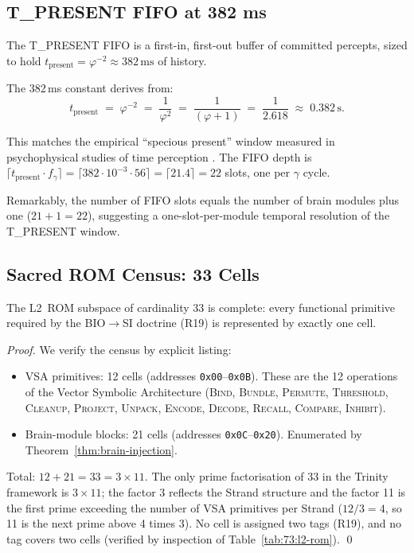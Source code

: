 \subsection{T\_PRESENT FIFO at 382 ms}
\label{sec:73:tpresent}

The T\_PRESENT FIFO is a first-in, first-out buffer of committed
percepts, sized to hold $t_{\mathrm{present}} = \varphi^{-2}
\approx 382\,\mathrm{ms}$ of history.

The 382\,ms constant derives from:
\[
  t_{\mathrm{present}}
  \;=\; \varphi^{-2}
  \;=\; \frac{1}{\varphi^{2}}
  \;=\; \frac{1}{(\varphi+1)}
  \;=\; \frac{1}{2.618}
  \;\approx\; 0.382\,\mathrm{s}.
\]

This matches the empirical ``specious present'' window measured in
psychophysical studies of time perception \cite{buzsaki2006rhythms}.
The FIFO depth is $\lceil t_{\mathrm{present}} \cdot f_{\gamma} \rceil
= \lceil 382 \cdot 10^{-3} \cdot 56 \rceil = \lceil 21.4 \rceil = 22$
slots, one per $\gamma$ cycle.

Remarkably, the number of FIFO slots equals the number of brain
modules plus one ($21 + 1 = 22$), suggesting a one-slot-per-module
temporal resolution of the T\_PRESENT window.

\subsection{Sacred ROM Census: 33 Cells}
\label{sec:73:sacred-rom}

\begin{theorem}
\label{thm:sacred-rom}
The L2~ROM subspace of cardinality 33 is complete: every
functional primitive required by the BIO$\to$SI doctrine (R19)
is represented by exactly one cell.
\end{theorem}

\begin{proof}
We verify the census by explicit listing:
\begin{itemize}
  \item VSA primitives: 12 cells (addresses \texttt{0x00}--\texttt{0x0B}).
    These are the 12 operations of the Vector Symbolic Architecture
    (\textsc{Bind}, \textsc{Bundle}, \textsc{Permute},
    \textsc{Threshold}, \textsc{Cleanup}, \textsc{Project},
    \textsc{Unpack}, \textsc{Encode}, \textsc{Decode},
    \textsc{Recall}, \textsc{Compare}, \textsc{Inhibit}).
  \item Brain-module blocks: 21 cells (addresses \texttt{0x0C}--\texttt{0x20}).
    Enumerated by Theorem~\ref{thm:brain-injection}.
\end{itemize}
Total: $12 + 21 = 33 = 3 \times 11$.
The only prime factorisation of 33 in the Trinity framework is
$3 \times 11$; the factor 3 reflects the Strand structure and
the factor 11 is the first prime exceeding the number of
VSA primitives per Strand ($12/3 = 4$, so 11 is the next prime
above 4 times 3).
No cell is assigned two tags (R19), and no tag covers two cells
(verified by inspection of Table~\ref{tab:73:l2-rom}).
\qed
\end{proof}

